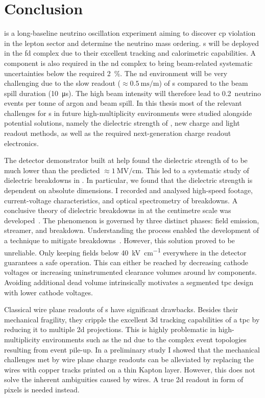 \chapter{Conclusion}
\label{chap:conclusion}

\dune{} is a long-baseline neutrino oscillation experiment aiming to discover \gls{cp} violation in the lepton sector and determine the neutrino mass ordering.
\lartpc{}s will be deployed in the \gls{fd} complex due to their excellent tracking and calorimetric capabilities.
A \lartpc{} component is also required in the \gls{nd} complex to bring beam-related systematic uncertainties below the required \SI{2}{\percent}.
The \gls{nd} environment will be very challenging due to the slow readout ($\approx \SI{0.5}{\milli\second\per\metre}$) of \lartpc{}s compared to the beam spill duration (\SI{10}{\micro\second}).
The high beam intensity will therefore lead to \num{0.2}~neutrino events per tonne of argon and beam spill.
In this thesis most of the relevant challenges for \lartpc{}s in future high-multiplicity environments were studied alongside potential solutions, namely the dielectric strength of \lar{}, new charge and light readout methods, as well as the required next-generation charge readout electronics.

The \AT{} detector demonstrator built at \gls{help} found the dielectric strength of \lar{} to be much lower than the predicted $\approx \SI{1}{\mega\volt\per\centi\metre}$.
This led to a systematic study of dielectric breakdowns in \lar{}.
In particular, we found that the dielectric strength is dependent on absolute dimensions.
I recorded and analysed high-speed footage, current-voltage characteristics, and optical spectrometry of breakdowns.
A conclusive theory of dielectric breakdowns in \lar{} at the centimetre scale was developed~\cite{breakdown_16}.
The phenomenon is governed by three distinct phases: field emission, streamer, and breakdown.
Understanding the process enabled the development of a technique to mitigate breakdowns~\cite{latex}.
However, this solution proved to be unreliable.
Only keeping fields below \SI{40}{\kilo\volt\per\centi\metre} everywhere in the detector guarantees a safe operation.
This can either be reached by decreasing cathode voltages or increasing uninstrumented clearance volumes around \gls{hv} components.
Avoiding additional dead \lar{} volume intrinsically motivates a segmented \gls{tpc} design with lower cathode voltages.

Classical wire plane readouts of \lartpc{}s have significant drawbacks.
Besides their mechanical fragility, they cripple the excellent \gls{3d} tracking capabilities of a \gls{tpc} by reducing it to multiple \gls{2d} projections.
This is highly problematic in high-multiplicity environments such as the \dune{} \gls{nd} due to the complex event topologies resulting from event pile-up.
In a preliminary study I showed that the mechanical challenges met by wire plane charge readouts can be alleviated by replacing the wires with copper tracks printed on a thin Kapton layer.
However, this does not solve the inherent ambiguities caused by wires.
A true \gls{2d} readout in form of pixels is needed instead.

